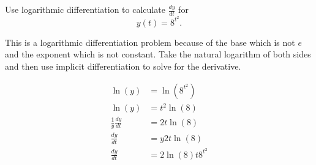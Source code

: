 \documentclass{ximera}
\author{Emma Smith Zbarsky}
\begin{document}
\begin{exercise}

Use logarithmic differentiation to calculate $\frac{dy}{dt}$ for
\[y(t) = 8^{t^2}.\]


\begin{hint}
This is a logarithmic differentiation problem because of the base which
is not $e$ and the exponent which is not constant. Take the natural
logarithm of both sides and then use implicit differentiation to solve
for the derivative.
\end{hint}


\begin{hint}
\begin{align*}
\ln(y) &= \ln\left(8^{t^2}\right) \\
\ln(y) &= t^2\ln(8) \\
\frac{1}{y}\frac{dy}{dt} &= 2t\ln(8) \\
\frac{dy}{dt} &= y2t\ln(8) \\
\frac{dy}{dt} &= 2\ln(8)t8^{t^2}
\end{align*}
\end{hint}


\begin{multipleChoice}
\end{multipleChoice}

\end{exercise}
\end{document}
